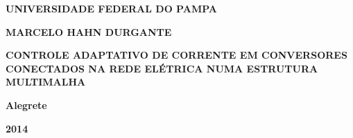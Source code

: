 \documentclass[12pt,
              openright,
              twoside,
              a4paper,
              english,
              french,
              spanish,
              sumario=tradicional,
              brazil
              ]{abntex2}
\renewcommand{\imprimircapa}{%
  \begin{capa}%
    \center
    \ABNTEXchapterfont\bfseries{UNIVERSIDADE FEDERAL DO PAMPA}

    \vspace*{5cm}

    {\ABNTEXchapterfont\bfseries{MARCELO HAHN DURGANTE}}

    \vspace*{3cm}

    \ABNTEXchapterfont\bfseries{CONTROLE ADAPTATIVO DE CORRENTE EM CONVERSORES CONECTADOS NA REDE ELÉTRICA NUMA ESTRUTURA MULTIMALHA}
    \vfill

    \normalsize\textbf{Alegrete}

    \par

    \normalsize\textbf{2014}

  \end{capa}
}
\begin{document}
\frenchspacing

\pretextual

\imprimircapa

\imprimirfolhaderosto*


%
%     
%
\begin{fichacatalografica}
  
\end{fichacatalografica}


%
% 
%
\begin{folhadeaprovacao}
  
\end{folhadeaprovacao}

%  

%  

\begin{epigrafe}
  
\end{epigrafe}
\end{document}
